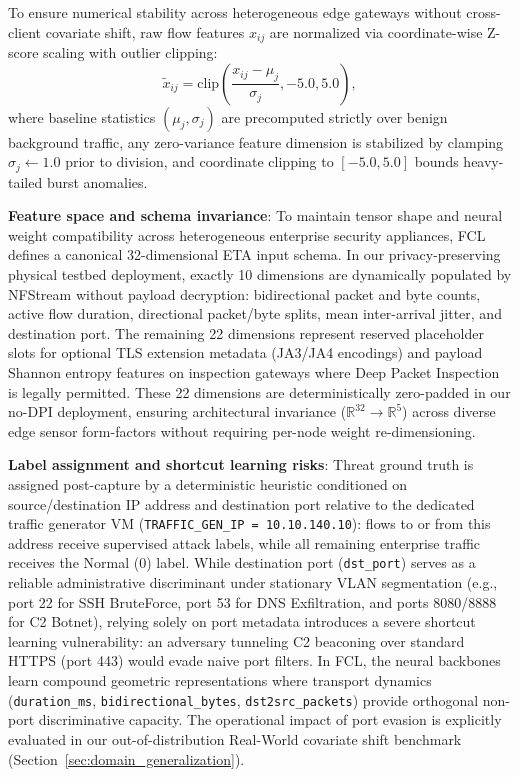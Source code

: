 \documentclass[journal,10pt,twocolumn]{IEEEtran}
\begin{document}
To ensure numerical stability across heterogeneous edge gateways without cross-client covariate shift, raw flow features $x_{ij}$ are normalized via coordinate-wise Z-score scaling with outlier clipping:
\begin{equation}
\tilde{x}_{ij} = \text{clip}\left(\frac{x_{ij} - \mu_j}{\sigma_j}, -5.0, 5.0\right),
\label{eq:zscore}
\end{equation}
where baseline statistics $(\mu_j, \sigma_j)$ are precomputed strictly over benign background traffic, any zero-variance feature dimension is stabilized by clamping $\sigma_j \leftarrow 1.0$ prior to division, and coordinate clipping to $[-5.0, 5.0]$ bounds heavy-tailed burst anomalies.

\textbf{Feature space and schema invariance}: To maintain tensor shape and neural weight compatibility across heterogeneous enterprise security appliances, FCL defines a canonical 32-dimensional ETA input schema. In our privacy-preserving physical testbed deployment, exactly 10 dimensions are dynamically populated by NFStream without payload decryption: bidirectional packet and byte counts, active flow duration, directional packet/byte splits, mean inter-arrival jitter, and destination port. The remaining 22 dimensions represent reserved placeholder slots for optional TLS extension metadata (JA3/JA4 encodings) and payload Shannon entropy features on inspection gateways where Deep Packet Inspection is legally permitted. These 22 dimensions are deterministically zero-padded in our no-DPI deployment, ensuring architectural invariance ($\mathbb{R}^{32} \to \mathbb{R}^5$) across diverse edge sensor form-factors without requiring per-node weight re-dimensioning.

\textbf{Label assignment and shortcut learning risks}: Threat ground truth is assigned post-capture by a deterministic heuristic conditioned on source/destination IP address and destination port relative to the dedicated traffic generator VM (\texttt{TRAFFIC\_GEN\_IP = 10.10.140.10}): flows to or from this address receive supervised attack labels, while all remaining enterprise traffic receives the Normal (0) label. While destination port (\texttt{dst\_port}) serves as a reliable administrative discriminant under stationary VLAN segmentation (e.g., port 22 for SSH BruteForce, port 53 for DNS Exfiltration, and ports 8080/8888 for C2 Botnet), relying solely on port metadata introduces a severe shortcut learning vulnerability: an adversary tunneling C2 beaconing over standard HTTPS (port 443) would evade naive port filters. In FCL, the neural backbones learn compound geometric representations where transport dynamics (\texttt{duration\_ms}, \texttt{bidirectional\_bytes}, \texttt{dst2src\_packets}) provide orthogonal non-port discriminative capacity. The operational impact of port evasion is explicitly evaluated in our out-of-distribution Real-World covariate shift benchmark (Section~\ref{sec:domain_generalization}).
\end{document}
